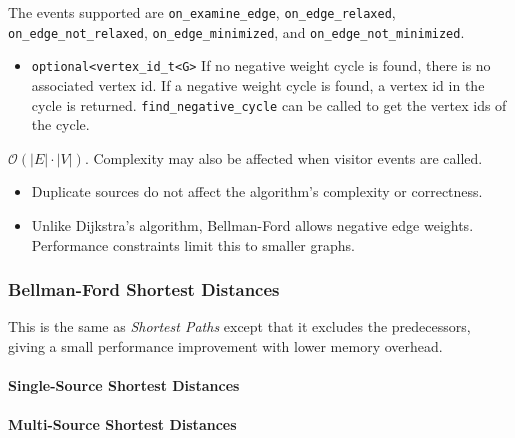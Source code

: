 \begin{itemdescr}
\begin{itemize}
                        The events supported are \lstinline{on_examine_edge}, \lstinline{on_edge_relaxed}, \lstinline{on_edge_not_relaxed},
                        \lstinline{on_edge_minimized}, and \lstinline{on_edge_not_minimized}.
            \end{itemize}
      \pnum\returns 
            \begin{itemize}
                  \item \lstinline{optional<vertex_id_t<G>} If no negative weight cycle is found, 
                        there is no associated vertex id. If a negative weight cycle is found, a
                        vertex id in the cycle is returned. \lstinline{find_negative_cycle}
                        can be called to get the vertex ids of the cycle.
            \end{itemize}
      \pnum\complexity $\mathcal{O}(|E| \cdot |V|)$. Complexity may also be affected when visitor events are called. \\
      \pnum\remarks 
            \begin{itemize}
                  \item Duplicate sources do not affect the algorithm's complexity or correctness.
                  \item Unlike Dijkstra's algorithm, Bellman-Ford allows negative edge weights. 
                        Performance constraints limit this to smaller graphs.
            \end{itemize}
\end{itemdescr}

\subsubsection{Bellman-Ford Shortest Distances}

This is the same as \textit{Shortest Paths} except that it excludes the predecessors,
giving a small performance improvement with lower memory overhead.

\paragraph{Single-Source Shortest Distances}
{\small
      
}

\paragraph{Multi-Source Shortest Distances}
{\small
      
}

